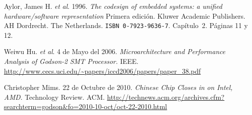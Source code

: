 %
%
\cleardoublepage
\pagebreak
{}
\begin{thebibliography}{99}
Aylor, James H. \textsl{et al}. 
  1996.
  \emph{The codesign of embedded systems: a unified hardware/software representation}
  Primera edición.
  Kluwer Academic Publishers.
  AH Dordrecht. The Netherlands.
  \texttt{ISBN~0-7923-9636-7}.
  Capítulo~2. Páginas 11 y 12.

Weiwu Hu. \textsl{et al}. 
  4 de Mayo del 2006.
  \emph{Microarchitecture and Performance Analysis of Godson-2 SMT Processor.}
  IEEE.
  \url{http://www.cecs.uci.edu/~papers/iccd2006/papers/paper_38.pdf}

 Christopher Mims.
  22 de Octubre de 2010.
  \emph{Chinese Chip Closes in on Intel, AMD.}
  Technology Review.
  ACM.
  \url{http://technews.acm.org/archives.cfm?searchterm=godson&fo=2010-10-oct/oct-22-2010.html}


\end{thebibliography}
